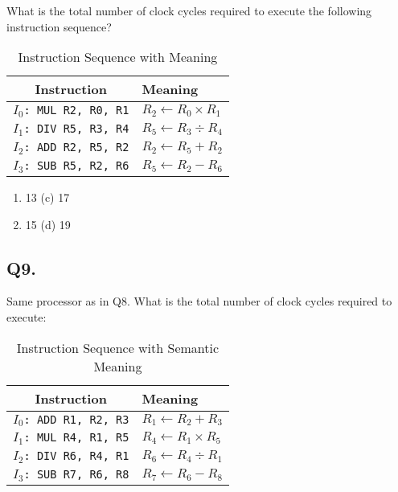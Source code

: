 What is the total number of clock cycles required to execute the following instruction sequence?

\begin{table}[H]
\centering
\renewcommand{\arraystretch}{1.3}
\begin{tabular}{|c|l|}
\hline
\textbf{Instruction} & \textbf{Meaning} \\
\hline
\texttt{$I_{0}$: MUL R2, R0, R1} & $R_2 \leftarrow R_0 \times R_1$ \\
\texttt{$I_{1}$: DIV R5, R3, R4} & $R_5 \leftarrow R_3 \div R_4$ \\
\texttt{$I_{2}$: ADD R2, R5, R2} & $R_2 \leftarrow R_5 + R_2$ \\
\texttt{$I_{3}$: SUB R5, R2, R6} & $R_5 \leftarrow R_2 - R_6$ \\
\hline
\end{tabular}
\caption{Instruction Sequence with Meaning}
\end{table}


\begin{enumerate}[label=(\alph*)]
    \item 13 \hspace{5cm} (c) 17
    \item 15 \hspace{5cm} (d) 19
\end{enumerate}


\subsection*{Q9.} Same processor as in Q8. What is the total number of clock cycles required to execute:

\begin{table}[H]
\centering
\renewcommand{\arraystretch}{1.3}
\begin{tabular}{|c|l|}
\hline
\textbf{Instruction} & \textbf{Meaning} \\
\hline
\texttt{$I_{0}$: ADD R1, R2, R3} & $R_1 \leftarrow R_2 + R_3$ \\
\texttt{$I_{1}$: MUL R4, R1, R5} & $R_4 \leftarrow R_1 \times R_5$ \\
\texttt{$I_{2}$: DIV R6, R4, R1} & $R_6 \leftarrow R_4 \div R_1$ \\
\texttt{$I_{3}$: SUB R7, R6, R8} & $R_7 \leftarrow R_6 - R_8$ \\
\hline
\end{tabular}
\caption{Instruction Sequence with Semantic Meaning}
\end{table}


